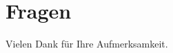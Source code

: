 \section{Fragen}
\begin{frame}
    \begin{center}
        \Large Vielen Dank für Ihre Aufmerksamkeit.
    \end{center}
\end{frame}